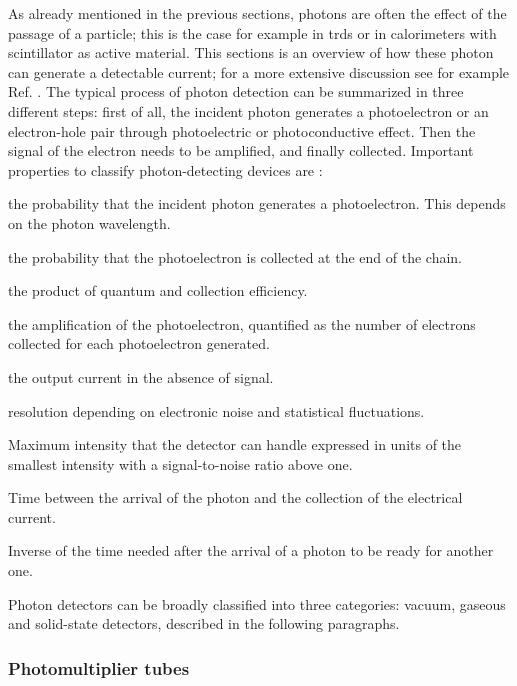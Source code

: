 As already mentioned in the previous sections, photons are often the effect of the passage of a particle; this is the case for example in \glspl{trd} or in calorimeters with scintillator as active material. This sections is an overview of how these photon can generate a detectable current; for a more extensive discussion see for example Ref. \cite{lightdetection,Grupen:2012zpa}. The typical process of photon detection can be summarized in three different steps: first of all, the incident photon generates a photoelectron or an electron-hole pair through photoelectric or photoconductive effect. Then the signal of the electron needs to be amplified, and finally collected. Important properties to classify photon-detecting devices are \cite{Patrignani:2016xqp}:
\begin{description}[font=\normalfont]
\item[\textit{Quantum efficiency}:] the probability that the incident photon generates a photoelectron. This depends on the photon wavelength.
\item[\textit{Collection efficiency}:] the probability that the photoelectron is collected at the end of the chain.
\item[\textit{Photon detection efficiency}:] the product of quantum and collection efficiency.
\item[\textit{Gain}:] the amplification of the photoelectron, quantified as the number of electrons collected for each photoelectron generated.
\item[\textit{Dark current or dark noise}:] the output current in the absence of signal.
\item[\textit{Energy resolution}:] resolution depending on electronic noise and statistical fluctuations.
\item[\textit{Dynamic range}:] Maximum intensity that the detector can handle expressed in units of the smallest intensity with a signal-to-noise ratio above one.
\item[\textit{Time dependence}] Time between the arrival of the photon and the collection of the electrical current.
\item[\textit{Rate capability}] Inverse of the time needed after the arrival of a photon to be ready for another one.
\end{description}

Photon detectors can be broadly classified into three categories: vacuum, gaseous and solid-state detectors, described in the following paragraphs.

\subsubsection*{Photomultiplier tubes}  

